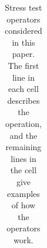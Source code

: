 \begin{table}[th!]
\begin{tabular}{l|l}

                \bottomrule
        \end{tabular}
        \caption{Stress test operators considered in this paper.
The first line in each cell describes the operation, and the remaining lines in
the cell give examples of how the operators work.}
        \label{table:proxyop}
\end{table}




